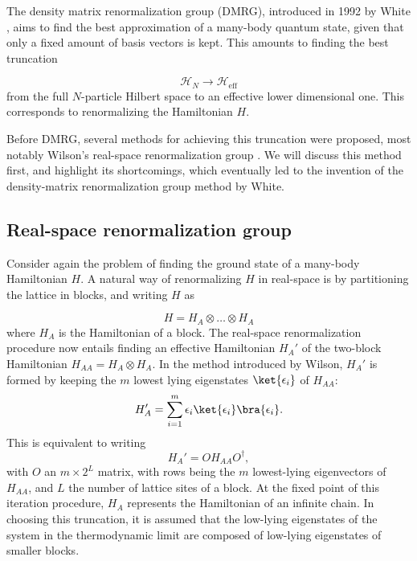 The density matrix renormalization group (DMRG), introduced in 1992 by
White \cite{white1992density}, aims to find the best approximation of
a many-body quantum state, given that only a fixed amount of basis vectors
is kept. This amounts to finding the best truncation

\begin{equation}
  \mathcal{H}_N \rightarrow \mathcal{H}_{\text{eff}}
\end{equation}
from the full $N$-particle Hilbert space to an effective lower dimensional
one. This corresponds to renormalizing the Hamiltonian $H$.

Before DMRG, several methods for achieving this truncation were proposed, most notably
Wilson's real-space renormalization group \cite{wilson1975renormalization}. We will
discuss this method first, and highlight its shortcomings, which eventually led to the
invention of the density-matrix renormalization group method by White.

\subsection{Real-space renormalization group}

Consider again the problem of finding the ground state of a many-body
Hamiltonian $H$. A natural way of renormalizing $H$ in real-space is by
partitioning the lattice in blocks, and writing $H$ as

\begin{equation}
  H = H_A \otimes \ldots \otimes H_A
\end{equation}
where $H_A$ is the Hamiltonian of a block.  The real-space
renormalization procedure now entails finding an effective Hamiltonian $H_{A}'$ of the
two-block Hamiltonian $H_{AA} = H_A \otimes H_A$. In the method introduced
by Wilson, $H_{A}'$ is formed by keeping the $m$ lowest lying eigenstates
$\ket{\epsilon_{i}}$ of $H_{AA}$:
\begin{equation}
  H_{A}' = \sum_{i = 1}^{m} \epsilon_{i} \ket{\epsilon_{i}}\bra{\epsilon_{i}}.
 \end{equation}
This is equivalent to writing
\begin{equation}
  H_{A}' = O H_{AA} O^{\dagger},
\end{equation}
with $O$ an $m \times 2^L$ matrix, with rows being the $m$ lowest-lying
eigenvectors of $H_{AA}$, and $L$ the number of lattice sites of a block. At
the fixed point of this iteration procedure, $H_A$ represents the
Hamiltonian of an infinite chain.
In choosing this truncation, it is assumed that the
low-lying eigenstates of the system in the thermodynamic limit are
composed of low-lying eigenstates of smaller blocks.

